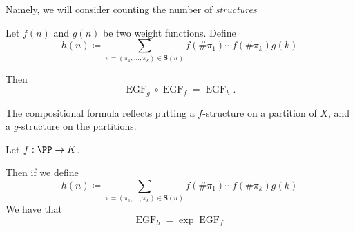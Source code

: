 \documentclass{article}
\DeclareMathOperator{\EGF}{EGF}
\begin{document}
Namely, we will consider counting the number of \textit{structures}


\begin{theorem}
    Let $f(n)$ and $g(n)$ be two weight functions.
    Define
    \[
        h(n)
        \coloneq
        \sum_{\pi = (\pi_1,\ldots,\pi_k) \in \mathbf{S}(n)}
        f(\#\pi_1)\cdots f(\#\pi_k) g(k)
    \]

    Then
    \[
        \EGF_g \circ \EGF_f = \EGF_h.
    \]
\end{theorem}

The compositional formula reflects putting a $f$-structure on a partition of $X$, and a $g$-structure on the partitions.

\begin{theorem}
    Let $f: \PP \to K$.

    Then if we define
    \[
        h(n)
        \coloneq
        \sum_{\pi = (\pi_1,\ldots,\pi_k) \in \mathbf{S}(n)}
        f(\#\pi_1)\cdots f(\#\pi_k) g(k)
    \]
    We have that
    \[
        \EGF_h = \exp \EGF_f 
    \]
\end{theorem}
\end{document}
